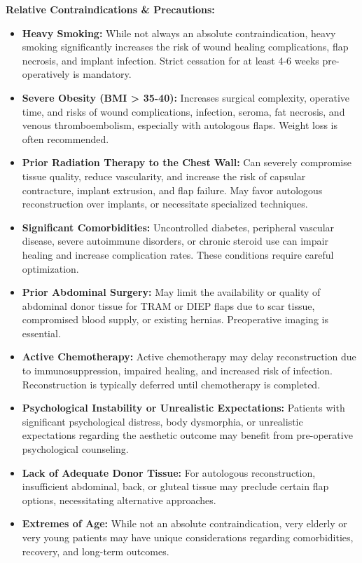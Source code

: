 \textbf{Relative Contraindications \& Precautions:}
\begin{itemize}
  \item \textbf{Heavy Smoking:} While not always an absolute contraindication, heavy smoking significantly increases the risk of wound healing complications, flap necrosis, and implant infection. Strict cessation for at least 4-6 weeks pre-operatively is mandatory.
  \item \textbf{Severe Obesity (BMI > 35-40):} Increases surgical complexity, operative time, and risks of wound complications, infection, seroma, fat necrosis, and venous thromboembolism, especially with autologous flaps. Weight loss is often recommended.
  \item \textbf{Prior Radiation Therapy to the Chest Wall:} Can severely compromise tissue quality, reduce vascularity, and increase the risk of capsular contracture, implant extrusion, and flap failure. May favor autologous reconstruction over implants, or necessitate specialized techniques.
  \item \textbf{Significant Comorbidities:} Uncontrolled diabetes, peripheral vascular disease, severe autoimmune disorders, or chronic steroid use can impair healing and increase complication rates. These conditions require careful optimization.
  \item \textbf{Prior Abdominal Surgery:} May limit the availability or quality of abdominal donor tissue for TRAM or DIEP flaps due to scar tissue, compromised blood supply, or existing hernias. Preoperative imaging is essential.
  \item \textbf{Active Chemotherapy:} Active chemotherapy may delay reconstruction due to immunosuppression, impaired healing, and increased risk of infection. Reconstruction is typically deferred until chemotherapy is completed.
  \item \textbf{Psychological Instability or Unrealistic Expectations:} Patients with significant psychological distress, body dysmorphia, or unrealistic expectations regarding the aesthetic outcome may benefit from pre-operative psychological counseling.
  \item \textbf{Lack of Adequate Donor Tissue:} For autologous reconstruction, insufficient abdominal, back, or gluteal tissue may preclude certain flap options, necessitating alternative approaches.
  \item \textbf{Extremes of Age:} While not an absolute contraindication, very elderly or very young patients may have unique considerations regarding comorbidities, recovery, and long-term outcomes.
\end{itemize}

